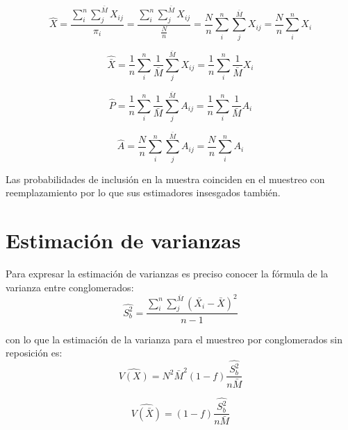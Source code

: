 \begin{equation}
    \hat{X} = \frac{\sum\limits_i^n\sum\limits_j^{\bar{M}}X_{ij}}{\pi_i} = \frac{\sum\limits_i^n\sum\limits_j^{\bar{M}}X_{ij}}{\frac{N}{n}} = \frac{N}{n}\sum\limits_i^n\sum\limits_j^{\bar{M}}X_{ij} = \frac{N}{n}\sum\limits_i^nX_i
\end{equation}

\begin{equation}
    \hat{\bar{X}} = \frac{1}{n}\sum\limits_i^n\frac{1}{\bar{M}}\sum\limits_j^{\bar{M}}X_{ij} = \frac{1}{n}\sum\limits_i^n\frac{1}{\bar{M}}X_i
\end{equation}

\begin{equation}
    \hat{P} = \frac{1}{n}\sum\limits_i^n\frac{1}{\bar{M}}\sum\limits_j^{\bar{M}}A_{ij} = \frac{1}{n}\sum\limits_i^n\frac{1}{\bar{M}}A_i
\end{equation}

\begin{equation}
    \hat{A} = \frac{N}{n}\sum\limits_i^n\sum\limits_j^{\bar{M}}A_{ij} = \frac{N}{n}\sum\limits_i^nA_i
\end{equation}

Las probabilidades de inclusión en la muestra coinciden en el muestreo con reemplazamiento por lo que sus estimadores insesgados también.

\section{Estimación de varianzas} \label{sect:6.3}
Para expresar la estimación de varianzas es preciso conocer la fórmula de la varianza entre conglomerados:\\

\begin{equation}
    \hat{S_b^2} = \frac{\sum\limits_i^n\sum\limits_j^{\bar{M}}(\bar{X_i}-\bar{X})^2}{n-1}
\end{equation}

con lo que la estimación de la varianza para el muestreo por conglomerados sin reposición es:\\

\begin{equation}
    \widehat{V(X)} = N^2\bar{M}^2(1-f)\frac{\hat{S_b^2}}{n\bar{M}}
\end{equation}

\begin{equation}
    \widehat{V(\bar{X})} = (1-f)\frac{\hat{S_b^2}}{n\bar{M}}
\end{equation}

